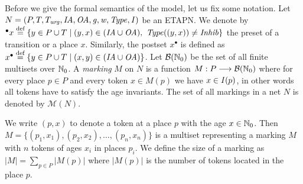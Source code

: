 Before we give the formal semantics of the model, let us fix some notation.
Let $N = (P, T, T_{\mathit{urg}}, \mathit{IA},\allowbreak \mathit{OA}, \mathit{g}, \mathit{w}, \mathit{Type}, \mathit{I})$ be an ETAPN. 
We denote by ${}^\bullet x \stackrel{\textrm{def}}{=} 
\{y \in P \cup T \mid (y,x) \in (\mathit{IA} \cup \mathit{OA}),\ \mathit{Type}((y,x)) \neq \mathit{Inhib} \}$ 
the preset of a transition or a place $x$.
Similarly, the postset $x^\bullet$ is defined as 
$x^\bullet \stackrel{\textrm{def}}{=} \{y \in P \cup T \mid (x,y) \in (\mathit{IA} \cup \mathit{OA}) \}$.
Let $\mathcal{B}(\mathbb{N}_{0})$ be the set 
of all finite multisets over $\mathbb{N}_{0}$. A \emph{marking} $M$ on $N$ 
is a function $M : P \longrightarrow \mathcal{B}(\mathbb{N}_{0})$ 
where for every place $p \in P$ and 
every token $x \in M(p)$ we have $x \in \mathit{I}(p)$, in other words
all tokens have to satisfy the age invariants. 
The set of all markings in a net $N$ 
is denoted by $\mathcal{M}(N)$.

We write $(p,x)$ to denote a token at a place $p$ with the 
age $x\in \mathbb{N}_{0}$. Then $M=\{(p_1,x_1),(p_2,x_2),\dots ,(p_n,x_n)\}$ 
is a multiset representing a marking $M$ with $n$ tokens of 
ages $x_i$ in places $p_i$. We 
define the size of a marking as $|M| = \sum_{p\in P}|M(p)|$ where 
$|M(p)|$ is the number of tokens located in the place $p$.


